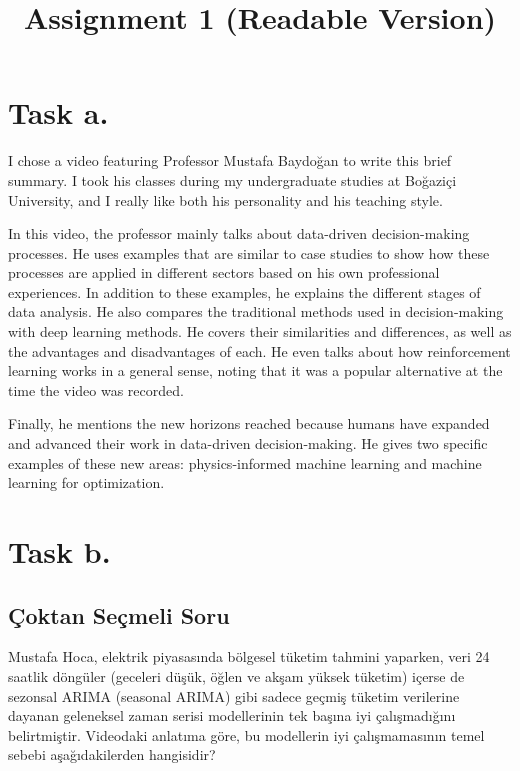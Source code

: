 \documentclass[
  letterpaper,
  DIV=11,
  numbers=noendperiod]{scrartcl}
\title{Assignment 1 (Readable Version)}
\author{}
\date{}
\begin{document}
\maketitle


\section{Task a.}\label{task-a.}

I chose a video featuring Professor Mustafa Baydoğan to write this brief
summary. I took his classes during my undergraduate studies at Boğaziçi
University, and I really like both his personality and his teaching
style.

In this video, the professor mainly talks about data-driven
decision-making processes. He uses examples that are similar to case
studies to show how these processes are applied in different sectors
based on his own professional experiences. In addition to these
examples, he explains the different stages of data analysis. He also
compares the traditional methods used in decision-making with deep
learning methods. He covers their similarities and differences, as well
as the advantages and disadvantages of each. He even talks about how
reinforcement learning works in a general sense, noting that it was a
popular alternative at the time the video was recorded.

Finally, he mentions the new horizons reached because humans have
expanded and advanced their work in data-driven decision-making. He
gives two specific examples of these new areas: physics-informed machine
learning and machine learning for optimization.

\section{Task b.}\label{task-b.}

\subsection{Çoktan Seçmeli Soru}\label{uxe7oktan-seuxe7meli-soru}

Mustafa Hoca, elektrik piyasasında bölgesel tüketim tahmini yaparken,
veri 24 saatlik döngüler (geceleri düşük, öğlen ve akşam yüksek tüketim)
içerse de sezonsal ARIMA (seasonal ARIMA) gibi sadece geçmiş tüketim
verilerine dayanan geleneksel zaman serisi modellerinin tek başına iyi
çalışmadığını belirtmiştir. Videodaki anlatıma göre, bu modellerin iyi
çalışmamasının temel sebebi aşağıdakilerden hangisidir?
\end{document}
